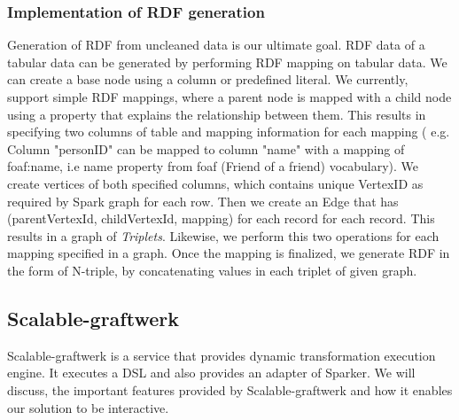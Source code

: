 \subsubsection{Implementation of RDF generation}
Generation of RDF from uncleaned data is our ultimate goal. RDF data of a tabular data can be generated by performing RDF mapping on tabular data. We can create a base node using a column or predefined literal. We currently, support simple RDF mappings, where a parent node is mapped with a child node using a property that explains the relationship between them. This results in specifying two columns of table and mapping information for each mapping ( e.g. Column "personID" can be mapped to column "name" with a mapping of foaf:name, i.e name property from foaf (Friend of a friend) vocabulary).  We create vertices of both specified columns, which contains unique VertexID as required by Spark graph for each row. Then we create an Edge that has (parentVertexId, childVertexId, mapping) for each record for each record. This results in a graph of \textit{Triplets}. Likewise, we perform this two operations for each mapping specified in a graph. Once the mapping is finalized,  we generate RDF in the form of N-triple, by concatenating values in each triplet of given graph. 

\subsection{Scalable-graftwerk}
Scalable-graftwerk is a service that provides dynamic transformation execution engine. It executes a DSL and also provides an adapter of Sparker. We will discuss, the important features provided by Scalable-graftwerk and how it enables our solution to be interactive.
